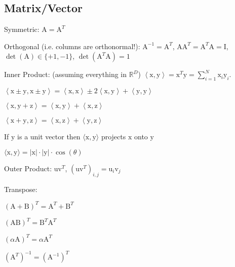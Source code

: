 \documentclass[a4paper, 11pt, landscape]{article}
\newcommand{\matr}[1]{\boldsymbol{\mathrm{#1}}}
\begin{document}
\begin{multicols*}{3}
\section{Matrix/Vector}
\begin{compactdesc}
	\item[Symmetric:] $\matr{A} = \matr{A}^T$
	\item[Orthogonal (i.e. columns are orthonormal!):] $\matr{A}^{-1} = \matr{A}^T$, $\matr{A} \matr{A}^T = \matr{A}^T \matr{A} = \matr{I}$, $\operatorname{det}(\matr{A}) \in \{+1, -1\}$, $\operatorname{det}(\matr{A}^T \matr{A}) = 1$
	\item[Inner Product:] (assuming everything in $\mathbb{R}^D$) $\left\langle \matr{x}, \matr{y} \right\rangle = \matr{x}^T \matr{y} = \sum_{i=1}^{N} \matr{x}_i \matr{y}_i$.
	\begin{compactitem}
		\item $\left\langle \matr{x} \pm \matr{y}, \matr{x} \pm \matr{y} \right\rangle = \left\langle \matr{x}, \matr{x} \right\rangle \pm 2 \left\langle \matr{x}, \matr{y} \right\rangle + \left\langle \matr{y}, \matr{y} \right\rangle$
		\item $\left\langle \matr{x}, \matr{y} + \matr{z} \right\rangle = \left\langle \matr{x}, \matr{y} \right\rangle + \left\langle \matr{x}, \matr{z} \right\rangle$
		\item $\left\langle \matr{x} + \matr{y}, \matr{z} \right\rangle = \left\langle \matr{x}, \matr{z} \right\rangle + \left\langle \matr{y}, \matr{z} \right\rangle$
		\item If $\matr{y}$ is a unit vector then $\langle \matr{x}, \matr{y} \rangle$ projects $\matr{x}$ onto $\matr{y}$
		\item $\langle \matr{x}, \matr{y} \rangle = |\matr{x}| \cdot |\matr{y}| \cdot \cos(\theta)$
	\end{compactitem}
	\item[Outer Product:] $\matr{u} \matr{v}^T$, $(\matr{u} \matr{v}^T)_{i, j} = \matr{u}_i \matr{v}_j$
	\item[Transpose:]\hfill
	{\setlength{\multicolsep}{0pt}
		\begin{multicols*}{2}
			\begin{compactitem}
				\item $(\matr{A} + \matr{B})^T = \matr{A}^T + \matr{B}^T$
				\item $(\matr{A}\matr{B})^T = \matr{B}^T \matr{A}^T$
				\item $(\alpha \matr{A})^T = \alpha \matr{A}^T$
				\item $(\matr{A}^T)^{-1} = (\matr{A}^{-1})^T$
			\end{compactitem}
		\end{multicols*}
	}
\end{compactdesc}


\end{multicols*}
\end{document}
